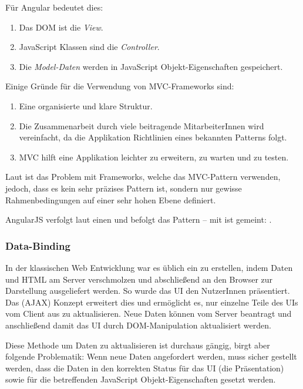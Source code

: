 \newpage
Für Angular bedeutet dies:
\begin{enumerate}
  \item Das DOM ist die \textit{View}.
  \item JavaScript Klassen sind die \textit{Controller}.
  \item Die \textit{Model-Daten} werden in JavaScript Objekt-Eigenschaften gespeichert.
\end{enumerate}

Einige Gründe für die Verwendung von MVC-Frameworks sind:
\begin{enumerate}
  \item Eine organisierte und klare Struktur.
  \item Die Zusammenarbeit durch viele beitragende MitarbeiterInnen wird vereinfacht, da die Applikation Richtlinien eines bekannten Patterns folgt.
  \item MVC hilft eine Applikation leichter zu erweitern, zu warten und zu testen.
\end{enumerate}

Laut \cite[12]{Kozlowski:2013} ist das Problem mit Frameworks, welche das MVC-Pattern verwenden, jedoch, dass es kein sehr präzises Pattern ist, sondern nur gewisse Rahmenbedingungen auf einer sehr hohen Ebene definiert.

AngularJS verfolgt laut \cite[13]{Kozlowski:2013} einen  und befolgt das  Pattern -- mit  ist gemeint:  \autocite{Angular:GooglePlus}.

\subsubsection{Data-Binding}
In der klassischen Web Entwicklung war es üblich ein  zu erstellen, indem Daten und HTML am Server verschmolzen und abschließend an den Browser zur Darstellung ausgeliefert werden. So wurde das UI den NutzerInnen präsentiert. Das  (AJAX) Konzept erweitert dies und ermöglicht es, nur einzelne Teile des UIs vom Client aus zu aktualisieren. Neue Daten können vom Server beantragt und anschließend damit das UI durch DOM-Manipulation aktualisiert werden.

Diese Methode um Daten zu aktualisieren ist durchaus gängig, birgt aber folgende Problematik: Wenn neue Daten angefordert werden, muss sicher gestellt werden, dass die Daten in den korrekten Status für das UI (die Präsentation) sowie für die betreffenden JavaScript Objekt-Eigenschaften gesetzt werden.

